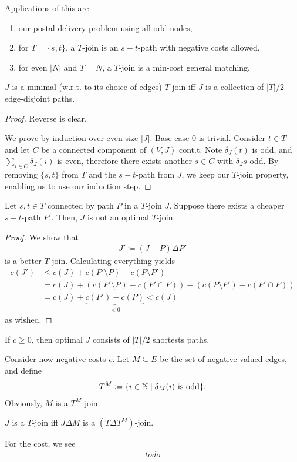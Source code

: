 \begin{example}
    Applications of this are
    \begin{enumerate}
        \item our postal delivery problem using all odd nodes,
        \item for $T=\{s,t\}$, a $T$-join is an $s-t$-path with negative costs allowed,
        \item for even $|N|$ and $T=N$, a $T$-join is a min-cost general matching.
    \end{enumerate}
\end{example}
\begin{theorem}
    $J$ is a minimal (w.r.t. to its choice of edges) $T$-join iff $J$ is a collection of $|T|/2$ edge-disjoint paths.
\end{theorem}
\begin{proof}
    Reverse is clear.

    We prove by induction over even size $|J|$. Base case $0$ is trivial.
    Consider $t \in T$ and let $C$ be a connected component of $(V,J)$ cont.t.
    Note $\delta_J(t)$ is odd, and $\sum_{i\in C}\delta_J(i)$ is even, therefore there exists
    another $s \in C$ with $\delta_J{s}$ odd.
    By removing $\{s,t\}$ from $T$ and the $s-t$-path from $J$, we keep our $T$-join property, enabling us to use our induction step.
\end{proof}
\begin{theorem}
    Let $s,t \in T$ connected by path $P$ in a $T$-join $J$. Suppose there exists a cheaper $s-t$-path $P'$.
    Then, $J$ is not an optimal $T$-join.
\end{theorem}
\begin{proof}
    We show that
    \begin{align*}
        J' \coloneqq (J - P) \Delta P'
    \end{align*}
    is a better $T$-join. 
    Calculating everything yields
    \begin{align*}
        c(J') & \leq c(J) + c(P' \setminus P) - c(P \setminus P')                                \\
              & = c(J) + (c(P' \setminus P) - c(P' \cap P)) - (c(P \setminus P') - c(P' \cap P)) \\
              & = c(J) + \underbrace{c(P')-c(P)}_{<0}< c(J)
    \end{align*}
    as wished.
\end{proof}
\begin{corollary}
    If $c \geq 0$, then optimal $J$ consists of $|T|/2$ shortests paths.
\end{corollary}
Consider now negative costs $c$. Let $M \subseteq E$ be the set of negative-valued edges, and define
\begin{align*}
    T^M \coloneqq  \{i \in \mathbb{N} \mid \delta_M(i) \text{ is odd}\}.
\end{align*}
Obviously, $M$ is a $T^M$-join.
\begin{fact}
    $J$ is a $T$-join iff $J \Delta M$ is a $(T \Delta T^M)$-join.
\end{fact}
For the cost, we see
\begin{align*}
    todo
\end{align*}
